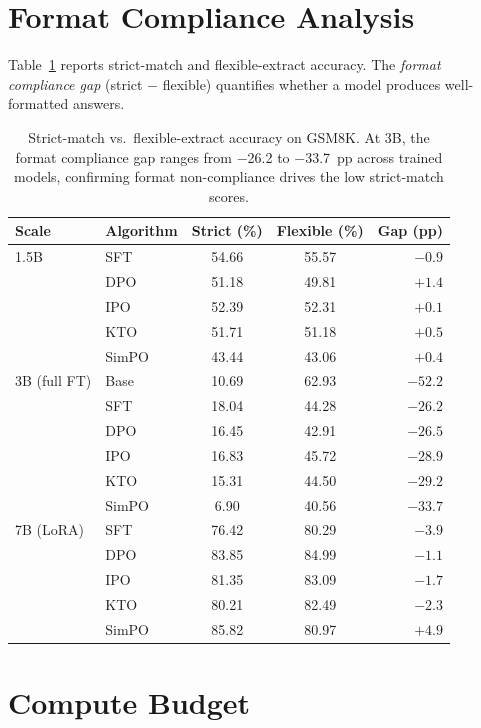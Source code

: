 \documentclass{article}
\begin{document}
\section{Format Compliance Analysis}
\label{app:format}

Table~\ref{tab:format_gap} reports strict-match and flexible-extract accuracy. The \emph{format compliance gap} (strict $-$ flexible) quantifies whether a model produces well-formatted answers.

\begin{table}[ht]
\centering
\caption{Strict-match vs.\ flexible-extract accuracy on GSM8K. At 3B, the format compliance gap ranges from $-$26.2 to $-$33.7~pp across trained models, confirming format non-compliance drives the low strict-match scores.}
\label{tab:format_gap}
\small
\begin{tabular}{@{}llccr@{}}
\toprule
\textbf{Scale} & \textbf{Algorithm} & \textbf{Strict (\%)} & \textbf{Flexible (\%)} & \textbf{Gap (pp)} \\
\midrule
1.5B & SFT & 54.66 & 55.57 & $-0.9$ \\
& DPO & 51.18 & 49.81 & $+1.4$ \\
& IPO & 52.39 & 52.31 & $+0.1$ \\
& KTO & 51.71 & 51.18 & $+0.5$ \\
& SimPO & 43.44 & 43.06 & $+0.4$ \\
\midrule
3B (full FT) & Base & 10.69 & 62.93 & $-52.2$ \\
 & SFT & 18.04 & 44.28 & $-26.2$ \\
 & DPO & 16.45 & 42.91 & $-26.5$ \\
 & IPO & 16.83 & 45.72 & $-28.9$ \\
 & KTO & 15.31 & 44.50 & $-29.2$ \\
 & SimPO & 6.90 & 40.56 & $-33.7$ \\
\midrule
7B (LoRA) & SFT & 76.42 & 80.29 & $-3.9$ \\
& DPO & 83.85 & 84.99 & $-1.1$ \\
& IPO & 81.35 & 83.09 & $-1.7$ \\
& KTO & 80.21 & 82.49 & $-2.3$ \\
& SimPO & 85.82 & 80.97 & $+4.9$ \\
\bottomrule
\end{tabular}
\end{table}

\section{Compute Budget}
\label{app:compute}
\end{document}
